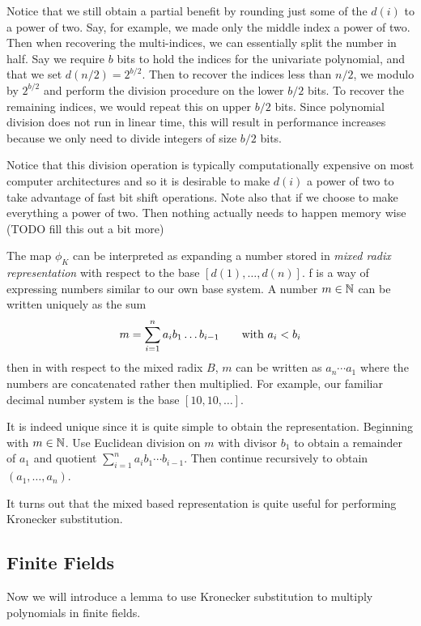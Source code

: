 \medskip

Notice that we still obtain a partial benefit by rounding just some of the $d(i)$ to a power of two. Say, for example, we made only the middle index a power of two. Then when recovering the multi-indices, we can essentially split the number in half. Say we require $b$ bits to hold the indices for the univariate polynomial, and that we set $d(n/2) = 2^{b/2}$. Then to recover the indices less than $n/2$, we modulo by $2^{b/2}$ and perform the division procedure on the lower $b/2$ bits. To recover the remaining indices, we would repeat this on upper $b/2$ bits. Since polynomial division does not run in linear time, this will result in performance increases because we only need to divide integers of size $b/2$ bits.

Notice that this division operation is typically computationally expensive on most computer architectures and so it is desirable to make $d(i)$ a power of two to take advantage of fast bit shift operations.
Note also that if we choose to make everything a power of two. Then nothing actually needs to happen memory wise
(TODO fill this out a bit more)

The map $\phi_K$ can be interpreted as expanding a number stored in \emph{mixed radix representation} with respect to the base $[d(1), \ldots, d(n)]$. f is a way of expressing numbers similar to our own base system. A number $m \in {\mathbb N}$ can be written uniquely as the sum
\[
    m = \sum^n_{i=1} a_i b_1 \ldots b_{i-1} \qquad \textrm{with } a_i < b_i
\]
then in with respect to the mixed radix $B$, $m$ can be written as $a_n \cdots a_1$ where the numbers are concatenated rather then multiplied. For example, our familiar decimal number system is the base $[10, 10, \ldots ]$.

It is indeed unique since it is quite simple to obtain the representation. Beginning with $m \in {\mathbb N}$. Use Euclidean division on $m$ with divisor $b_1$ to obtain a remainder of $a_1$ and quotient $\sum^n_{i=1} a_i b_1 \cdots b_{i-1}$. Then continue recursively to obtain $(a_1, \ldots, a_n)$. 

It turns out that the mixed based representation is quite useful for performing Kronecker substitution.

\subsection{Finite Fields}%
\label{sub:Finite Field}

Now we will introduce a lemma to use Kronecker substitution to multiply polynomials in finite fields.

